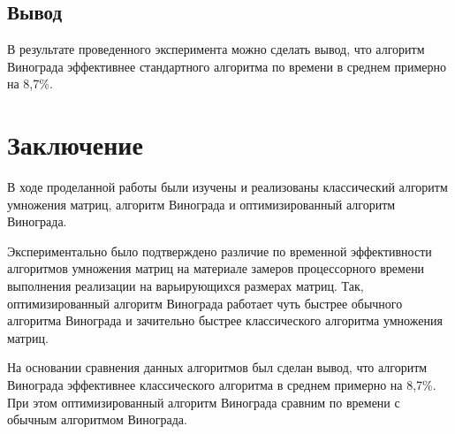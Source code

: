 \documentclass[12pt]{report}
\begin{document}
	\section{Вывод}
	
	В результате проведенного эксперимента можно сделать вывод, что алгоритм Винограда эффективнее стандартного алгоритма по времени в среднем примерно на 8,7\%.
	
	
	\chapter*{Заключение}
	
	В ходе проделанной работы были изучены и реализованы классический алгоритм умножения матриц, алгоритм Винограда и оптимизированный алгоритм Винограда. 
	
	Экспериментально было подтверждено различие по временной эффективности алгоритмов умножения матриц на материале замеров процессорного времени выполнения реализации на варьирующихся размерах матриц. Так, оптимизированный алгоритм Винограда работает чуть быстрее обычного алгоритма Винограда и зачительно быстрее классического алгоритма умножения матриц.
	
	На основании сравнения данных алгоритмов был сделан вывод, что алгоритм Винограда эффективнее классического алгоритма в среднем примерно на 8,7\%. При этом оптимизированный алгоритм Винограда сравним по времени с обычным алгоритмом Винограда.
	
	
	
	
\end{document}
